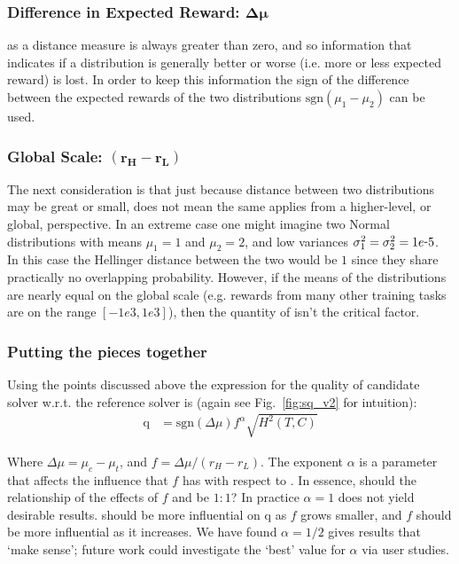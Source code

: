 \subsubsection{Difference in Expected Reward: $\bm{\Delta \mu}$}
\hell{} as a distance measure is always greater than zero, and so information that indicates if a distribution is generally better or worse (i.e. more or less expected reward) is lost. In order to keep this information the sign of the difference between the expected rewards of the two distributions $\text{sgn}(\mu_1-\mu_2)$ can be used.

\subsubsection{Global Scale: $\bm{(r_H-r_L)}$}
The next consideration is that just because distance between two distributions may be great or small, does not mean the same applies from a higher-level, or global, perspective. In an extreme case one might imagine two Normal distributions with means $\mu_1=1$ and $\mu_2=2$, and low variances $\sigma_1^2=\sigma_2^2=1e\-5$. In this case the Hellinger distance between the two would be $1$ since they share practically no overlapping probability. However, if the means of the distributions are nearly equal on the global scale (e.g. rewards from many other training tasks are on the range $[-1e3,1e3]$), then the quantity of \hell{} isn't the critical factor.

\subsubsection{Putting the pieces together}
Using the points discussed above the expression for the quality of candidate solver \solve{} w.r.t. the reference solver \solvestar{} is (again see Fig.~\ref{fig:sq_v2} for intuition):
\begin{align}
    \text{q} &= \text{sgn}(\Delta \mu)f^{\alpha}\sqrt{H^{2}(T,C)} \label{eq:q}
\end{align}

Where $\Delta \mu = \mu_c-\mu_t$, and $f = \Delta \mu/(r_H-r_L)$. The exponent $\alpha$ is a parameter that affects the influence that $f$ has with respect to \hell. In essence, should the relationship of the effects of $f$ and \hell{} be $1:1$? In practice $\alpha=1$ does not yield desirable results. \hell{} should be more influential on $\text{q}$ as $f$ grows smaller, and $f$ should be more influential as it increases. We have found $\alpha=1/2$ gives results that `make sense'; future work could investigate the `best' value for $\alpha$ via user studies.

